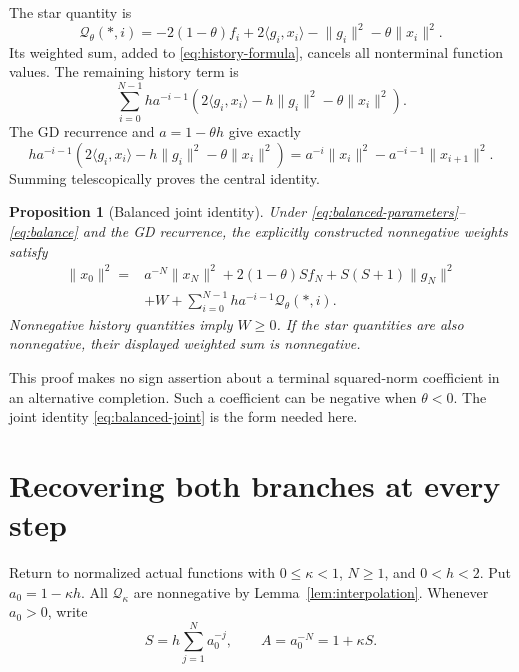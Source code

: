 \documentclass[11pt]{article}
\numberwithin{equation}{section}
\newtheorem{proposition}[theorem]{Proposition}
\theoremstyle{remark}
\newcommand{\ip}[2]{\langle #1,#2\rangle}
\newcommand{\norm}[1]{\lVert #1\rVert}
\newcommand{\Q}{\mathcal Q}
\begin{document}
The star quantity is
\begin{equation}
\Q_\theta(*,i)
=-2(1-\theta)f_i+2\ip{g_i}{x_i}
 -\norm{g_i}^2-\theta\norm{x_i}^2.
\label{eq:starQ}
\end{equation}
Its weighted sum, added to \eqref{eq:history-formula}, cancels all
nonterminal function values. The remaining history term is
\[
\sum_{i=0}^{N-1}ha^{-i-1}
 \left(2\ip{g_i}{x_i}-h\norm{g_i}^2-\theta\norm{x_i}^2\right).
\]
The GD recurrence and $a=1-\theta h$ give exactly
\begin{equation}
ha^{-i-1}
 \left(2\ip{g_i}{x_i}-h\norm{g_i}^2-\theta\norm{x_i}^2\right)
=a^{-i}\norm{x_i}^2-a^{-i-1}\norm{x_{i+1}}^2.
\label{eq:weighted-telescope}
\end{equation}
Summing telescopically proves the central identity.

\begin{proposition}[Balanced joint identity]
\label{prop:balanced}
Under \eqref{eq:balanced-parameters}--\eqref{eq:balance} and the GD
recurrence, the explicitly constructed nonnegative weights satisfy
\begin{equation}
\begin{split}
\norm{x_0}^2={}&a^{-N}\norm{x_N}^2
 +2(1-\theta)Sf_N+S(S+1)\norm{g_N}^2\\
&+W+\sum_{i=0}^{N-1}ha^{-i-1}\Q_\theta(*,i).
\end{split}
\label{eq:balanced-joint}
\end{equation}
Nonnegative history quantities imply $W\geq0$. If the star quantities
are also nonnegative, their displayed weighted sum is nonnegative.
\end{proposition}

This proof makes no sign assertion about a terminal squared-norm
coefficient in an alternative completion. Such a coefficient can be
negative when $\theta<0$. The joint identity \eqref{eq:balanced-joint}
is the form needed here.

\section{Recovering both branches at every step}

Return to normalized actual functions with $0\leq\kappa<1$,
$N\geq1$, and $0<h<2$. Put $a_0=1-\kappa h$.
All $\Q_\kappa$ are nonnegative by Lemma~\ref{lem:interpolation}.
Whenever $a_0>0$, write
\begin{equation}
S=h\sum_{j=1}^N a_0^{-j},\qquad A=a_0^{-N}=1+\kappa S.
\label{eq:target-SA}
\end{equation}
\end{document}

